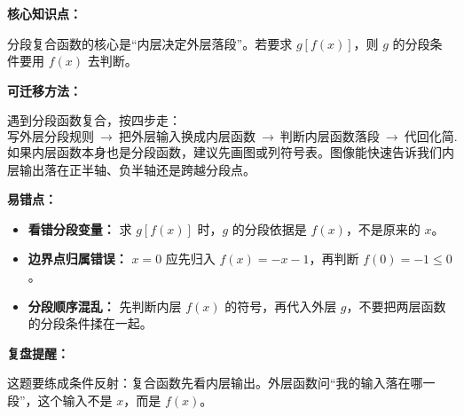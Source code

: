 \begin{knowledgeBox}
\textbf{核心知识点：}

分段复合函数的核心是“内层决定外层落段”。若要求 \(g[f(x)]\)，则 \(g\) 的分段条件要用 \(f(x)\) 去判断。

\textbf{可迁移方法：}

遇到分段函数复合，按四步走：
\[
\text{写外层分段规则}\ \longrightarrow\ \text{把外层输入换成内层函数}\ \longrightarrow\ \text{判断内层函数落段}\ \longrightarrow\ \text{代回化简}.
\]
如果内层函数本身也是分段函数，建议先画图或列符号表。图像能快速告诉我们内层输出落在正半轴、负半轴还是跨越分段点。
\end{knowledgeBox}

\begin{mistakeBox}
\textbf{易错点：}

\begin{itemize}
  \item \textbf{看错分段变量：} 求 \(g[f(x)]\) 时，\(g\) 的分段依据是 \(f(x)\)，不是原来的 \(x\)。
  \item \textbf{边界点归属错误：} \(x=0\) 应先归入 \(f(x)=-x-1\)，再判断 \(f(0)=-1\le 0\)。
  \item \textbf{分段顺序混乱：} 先判断内层 \(f(x)\) 的符号，再代入外层 \(g\)，不要把两层函数的分段条件揉在一起。
\end{itemize}

\textbf{复盘提醒：}

这题要练成条件反射：复合函数先看内层输出。外层函数问“我的输入落在哪一段”，这个输入不是 \(x\)，而是 \(f(x)\)。
\end{mistakeBox}

\par

